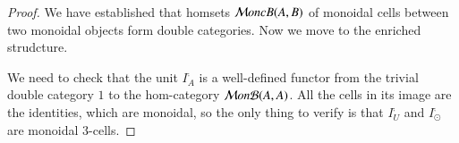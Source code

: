 \begin{proof}
We have established that homsets $\mathcal{M} oncB(A,B)$ of monoidal cells between two monoidal objects form double categories. Now we move to the enriched strudcture.

We need to check that the unit $I^{\comp}_A$ is a well-defined functor from the trivial double category $1$ to the hom-category $\mathcal{M} on\mathcal{B}(A,A)$. 
All the cells in its image are the identities, which are monoidal, so the only thing to verify is that $I^{\comp}_{U}$ and $I^{\comp}_{\odot}$ are monoidal 3-cells. 









\end{proof}


